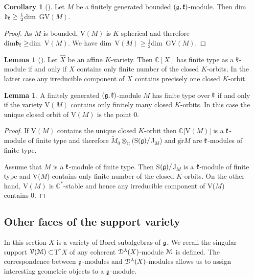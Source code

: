 \documentclass[12pt]{amsart}
\theoremstyle{definition}\newtheorem{theorem}{Theorem}[section]
\newtheorem{lemma}[proposition]{Lemma}
\newtheorem{corollary}[proposition]{Corollary}
\theoremstyle{definition}\newtheorem{definition}[proposition]{Definition}
\theoremstyle{remark}\newtheorem{example}[proposition]{Example}
\begin{document}
\begin{corollary}[{\cite{PS}}]\label{Cps} Let $M$ be a finitely generated bounded $(\frak g, \frak k)$-module. Then dim$\frak b_\frak k \ge\frac{1}{2}$dim~GV$(M)$.\end{corollary}
\begin{proof}As $M$ is bounded, V$(M)$ is $K$-spherical and therefore\\ dim$\frak b_\frak k\ge$dim~V$(M)$. We have dim~V$(M)\ge\frac{1}{2}$dim~GV$(M)$.\end{proof}
\begin{lemma}[\cite{VP}] Let $\hat X$ be an affine $K$-variety. Then $\mathbb C[X]$ has finite type as a $\frak k$-module if and only if $X$ contains only finite number of the closed $K$-orbits. In the latter case any irreducible component of $X$ contains precisely one closed $K$-orbit.\end{lemma}
\begin{lemma}A finitely generated $(\frak g, \frak k)$-module $M$ has finite type over $\frak k$ if and only if the variety V$(M)$ contains only finitely many closed $K$-orbits. In this case the unique closed orbit of V$(M)$ is the point 0.\end{lemma}
\begin{proof}If V$(M)$ contains the unique closed $K$-orbit then $\mathbb C[$V$(M)]$ is a $\frak k$-module of finite type and therefore $\tilde M_0\otimes_\mathbb C($S$(\frak g)/$J$_M$) and $\overline{\mathrm{gr}}M$ are $\frak k$-modules of finite type.

Assume that $M$ is a $\frak k$-module of finite type. Then S$(\frak g)/$J$_M$ is a $\frak k$-module of finite type and V($M$) contains only finite number of the closed $K$-orbits. On the other hand, V$(M)$ is $\mathbb C^*$-stable and hence any irreducible component of V($M$) contains 0.\end{proof}
\subsection{Other faces of the support variety}\label{SSof}In this section $X$ is a variety of Borel subalgebras of $\frak g$. We recall the singular support $\EuScript V(\EuScript M)\subset$T$^*X$ of any coherent $\EuScript D^\lambda(X)$-module $\EuScript M$  is defined. The correspondence between $\frak g$-modules and $\EuScript D^\lambda(X)$-modules allows us to assign interesting geometric objects to a $\frak g$-module.
\end{document}
